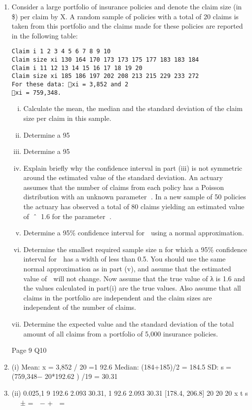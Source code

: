 \documentclass[a4paper,12pt]{article}
\begin{document}
\begin{enumerate}
\item 

Consider a large portfolio of insurance policies and denote the claim size (in \$) per
claim by X. A random sample of policies with a total of 20 claims is taken from this
portfolio and the claims made for these policies are reported in the following table:
\begin{verbatim}
Claim i 1 2 3 4 5 6 7 8 9 10
Claim size xi 130 164 170 173 173 175 177 183 183 184
Claim i 11 12 13 14 15 16 17 18 19 20
Claim size xi 185 186 197 202 208 213 215 229 233 272
For these data: xi = 3,852 and 2
xi = 759,348.
\end{verbatim}

\begin{enumerate}[(i)]
\item  Calculate the mean, the median and the standard deviation of the claim size per claim in this sample. 
\item Determine a 95%
\item Determine a 95%
\item Explain briefly why the confidence interval in part (iii) is not symmetric around the estimated value of the standard deviation. 
An actuary assumes that the number of claims from each policy has a Poisson distribution with an unknown parameter . In a new sample of 50 policies the actuary has observed a total of 80 claims yielding an estimated value of ˆ 1.6 for the
parameter .
\item  Determine a 95\% confidence interval for  using a normal approximation. 
\item  Determine the smallest required sample size n for which a 95\% confidence interval for  has a width of less than 0.5. You should use the same normal approximation as in part (v), and assume that the estimated value of  will not
change. 
Now assume that the true value of λ is 1.6 and the values calculated in part(i) are the
true values. Also assume that all claims in the portfolio are independent and the claim
sizes are independent of the number of claims.
\item  Determine the expected value and the standard deviation of the total amount of
all claims from a portfolio of 5,000 insurance policies. 
\end{enumerate}
Page 9
Q10 \item (i) Mean: x = 3,852 / 20 =1 92.6 
Median: (184+185)/2 = 184.5 
SD: s = (759,348− 20*192.62 ) /19 = 30.31 
\item (ii) 0.025,1 9
192.6 2.093 30.31, 1 92.6 2.093 30.31 [178.4, 206.8]
20 20 20
x t s  
± =  − +  =
   


\end{enumerate}
\end{document}
